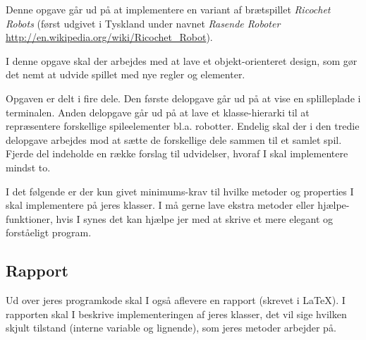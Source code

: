 
\newcommand{\exampleboard}{%
  \draw[step=10mm,color=gray,thin] (0,0) grid (7,-4);
  \draw[ultra thick] (0,0) rectangle (7,-4);
  \foreach \col in {1,...,7} {
    \node at (\col-0.5, 0.25) {\footnotesize\col};
  };
  \foreach \row in {1,...,4} {
    \node at (-0.25, 0.5-\row) {\footnotesize\row};
  };
  \draw[line width=3pt] (2,-2) -- (3,-2) -- (3,-1) -- (5,-1);
  \node at (5.5,-2.5) {\footnotesize{}goal};
}


\newcommand*{\TODO}[1]{\textsf{TODO: #1}}

Denne opgave går ud på at implementere en variant af brætspillet
\emph{Ricochet Robots} (først udgivet i Tyskland under navnet
\emph{Rasende Roboter}
\url{http://en.wikipedia.org/wiki/Ricochet_Robot}).

I denne opgave skal der arbejdes med at lave et objekt-orienteret
design, som gør det nemt at udvide spillet med nye regler og elementer.

Opgaven er delt i fire dele. Den første delopgave går ud på at vise en
splilleplade i terminalen. Anden delopgave går ud på at lave et
klasse-hierarki til at repræsentere forskellige spileelementer
bl.a. robotter. Endelig skal der i den tredie delopgave arbejdes mod
at sætte de forskellige dele sammen til et samlet spil. Fjerde del
indeholde en række forslag til udvidelser, hvoraf I skal implementere
mindst to.

I det følgende er der kun givet minimums-krav til hvilke metoder og
properties I skal implementere på jeres klasser. I må gerne lave
ekstra metoder eller hjælpe-funktioner, hvis I synes det kan hjælpe
jer med at skrive et mere elegant og forståeligt program.


\subsection*{Rapport}


Ud over jeres programkode skal I også aflevere en rapport (skrevet i
\LaTeX). I rapporten skal I beskrive implementeringen af jeres
klasser, det vil sige hvilken skjult tilstand (interne variable og
lignende), som jeres metoder arbejder på.

